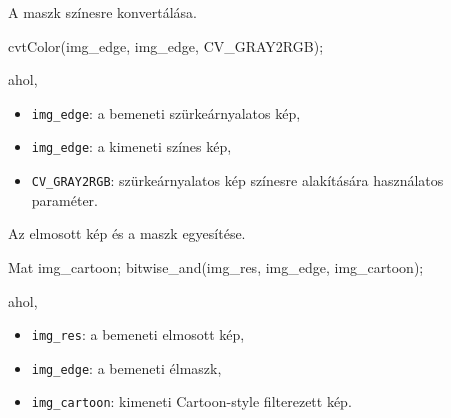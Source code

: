 A maszk színesre konvertálása.
\begin{cpp}
cvtColor(img_edge, img_edge, CV_GRAY2RGB);
\end{cpp}
ahol,
\begin{itemize}
    \item \texttt{img\_edge}: a bemeneti szürkeárnyalatos kép,
    \item \texttt{img\_edge}: a kimeneti színes kép,
    \item \texttt{CV\_GRAY2RGB}: szürkeárnyalatos kép színesre alakítására használatos paraméter.
\end{itemize}
Az elmosott kép és a maszk egyesítése. 
\begin{cpp}
Mat img_cartoon;
bitwise_and(img_res, img_edge, img_cartoon);
\end{cpp}
ahol,
\begin{itemize}
    \item \texttt{img\_res}: a bemeneti elmosott kép,
    \item \texttt{img\_edge}: a bemeneti élmaszk,
    \item \texttt{img\_cartoon}: kimeneti Cartoon-style filterezett kép.
\end{itemize}


